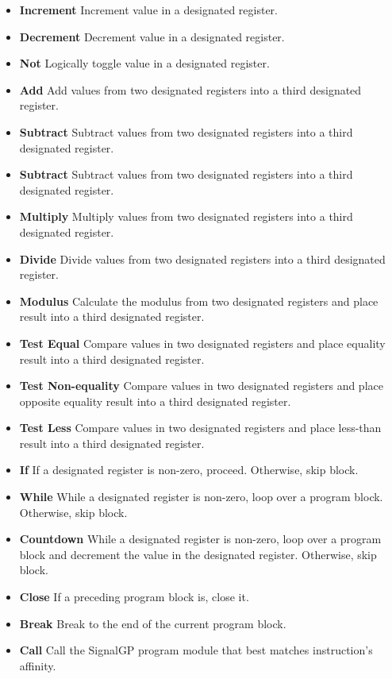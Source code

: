 \begin{itemize}
\item \textbf{Increment}
Increment value in a designated register.
\item \textbf{Decrement}
Decrement value in a designated register.
\item \textbf{Not}
Logically toggle value in a designated register.
\item \textbf{Add}
Add values from two designated registers into a third designated register.
\item \textbf{Subtract}
Subtract values from two designated registers into a third designated register.
\item \textbf{Subtract}
Subtract values from two designated registers into a third designated register.
\item \textbf{Multiply}
Multiply values from two designated registers into a third designated register.
\item \textbf{Divide}
Divide values from two designated registers into a third designated register.
\item \textbf{Modulus}
Calculate the modulus from two designated registers and place result into a third designated register.
\item \textbf{Test Equal}
Compare values in two designated registers and place equality result into a third designated register.
\item \textbf{Test Non-equality}
Compare values in two designated registers and place opposite equality result into a third designated register.
\item \textbf{Test Less}
Compare values in two designated registers and place less-than result into a third designated register.
\item \textbf{If}
If a designated register is non-zero, proceed.
Otherwise, skip block.
\item \textbf{While}
While a designated register is non-zero, loop over a program block.
Otherwise, skip block.
\item \textbf{Countdown}
While a designated register is non-zero, loop over a program block and decrement the value in the designated register.
Otherwise, skip block.
\item \textbf{Close}
If a preceding program block is, close it.
\item \textbf{Break}
Break to the end of the current program block.
\item \textbf{Call}
Call the SignalGP program module that best matches instruction's affinity.

\end{itemize}
